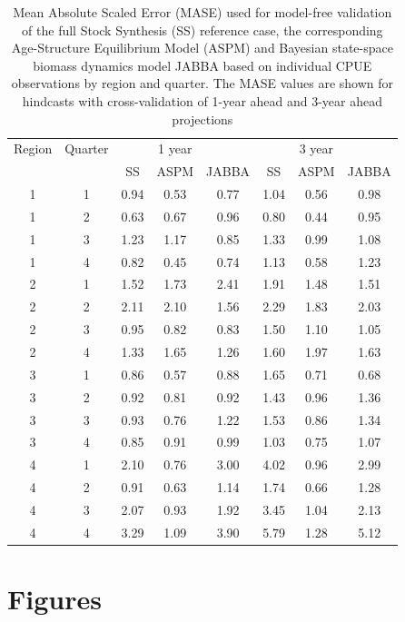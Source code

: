 \documentclass[12pt,halfline,a4paper,nonumbib]{ouparticle}
\begin{document}
\begin{table}[ht]
\caption{Mean Absolute Scaled Error (MASE) used for model-free validation of  the full Stock Synthesis (SS) reference case, the corresponding Age-Structure Equilibrium Model (ASPM) and Bayesian state-space biomass dynamics model JABBA based on individual CPUE observations by region and quarter. The MASE values are shown for hindcasts with cross-validation of 1-year ahead and 3-year ahead projections  }
\begin{center}
\label{tab:mase}
\small
\begin{tabular}{|cc|ccc|ccc|}
\hline
Region & Quarter &    & 1 year & & & 3 year &   \\
     &         & SS & ASPM & JABBA & SS & ASPM & JABBA  \\
\hline\hline
  1 & 1 & 0.94 & 0.53 & 0.77 & 1.04 & 0.56 & 0.98 \\ 
  1 & 2 & 0.63 & 0.67 & 0.96 & 0.80 & 0.44 & 0.95 \\ 
  1 & 3 & 1.23 & 1.17 & 0.85 & 1.33 & 0.99 & 1.08 \\ 
   1 & 4 & 0.82 & 0.45 & 0.74 & 1.13 & 0.58 & 1.23 \\ 
  2 & 1 & 1.52 & 1.73 & 2.41 & 1.91 & 1.48 & 1.51 \\ 
  2 & 2 & 2.11 & 2.10 & 1.56 & 2.29 & 1.83 & 2.03 \\ 
  2 & 3 & 0.95 & 0.82 & 0.83 & 1.50 & 1.10 & 1.05 \\ 
  2 & 4 & 1.33 & 1.65 & 1.26 & 1.60 & 1.97 & 1.63 \\ 
  3 & 1 & 0.86 & 0.57 & 0.88 & 1.65 & 0.71 & 0.68 \\ 
  3 & 2 & 0.92 & 0.81 & 0.92 & 1.43 & 0.96 & 1.36 \\ 
  3 & 3 & 0.93 & 0.76 & 1.22 & 1.53 & 0.86 & 1.34 \\ 
  3 & 4 & 0.85 & 0.91 & 0.99 & 1.03 & 0.75 & 1.07 \\ 
  4 & 1 & 2.10 & 0.76 & 3.00 & 4.02 & 0.96 & 2.99 \\ 
  4 & 2 & 0.91 & 0.63 & 1.14 & 1.74 & 0.66 & 1.28 \\ 
  4 & 3 & 2.07 & 0.93 & 1.92 & 3.45 & 1.04 & 2.13 \\ 
  4 & 4 & 3.29 & 1.09 & 3.90 & 5.79 & 1.28 & 5.12 \\ 
\hline
\end{tabular}
\end{center}
\end{table}


\clearpage
\newpage
\section{Figures}
\end{document}
